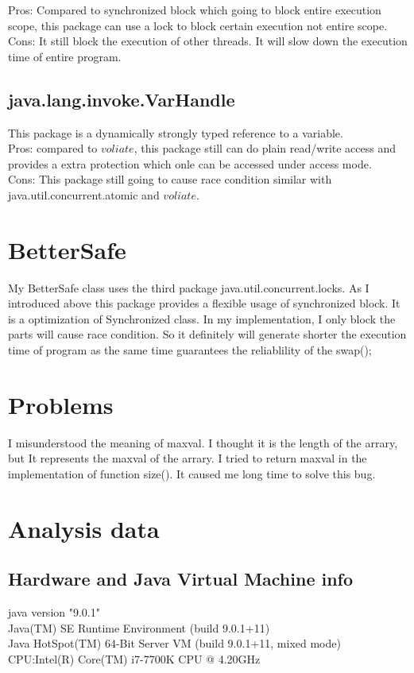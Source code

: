 \documentclass[10pt, a4paper]{IEEEtran}
\begin{document}
    Pros: Compared to synchronized block which going to block entire execution scope, this package can use a lock to block certain execution not entire scope.\\
    
    Cons: It still block the execution of other threads. It will slow down the execution time of entire program.\\
    \subsection{java.lang.invoke.VarHandle}
    This package  is a dynamically strongly typed reference to a variable.\\
    Pros: compared to $voliate$, this package still can do plain read/write access and provides a extra protection which onle can be accessed under access mode.\\
    Cons: This package still going to cause race condition similar with java.util.concurrent.atomic and $voliate$.\\

    \section{BetterSafe}
    My BetterSafe class uses the third package java.util.concurrent.locks. As I introduced above this package provides a flexible usage of synchronized block. It is a optimization of Synchronized class. In my implementation, I only block the parts will cause race condition. So it definitely will generate shorter the execution time of program as the same time guarantees the reliablility of the swap();

    \section{Problems}
    I misunderstood the meaning of maxval. I thought it is the length of the arrary, but It represents the maxval of the arrary. I tried to return maxval in the implementation of function size(). It caused me long time to solve this bug.

    \section{Analysis data}
    \subsection{Hardware and Java Virtual Machine info}
    java version "9.0.1"\\
    Java(TM) SE Runtime Environment (build 9.0.1+11)\\
    Java HotSpot(TM) 64-Bit Server VM (build 9.0.1+11, mixed mode)\\
    CPU:Intel(R) Core(TM) i7-7700K CPU @ 4.20GHz
\end{document}
